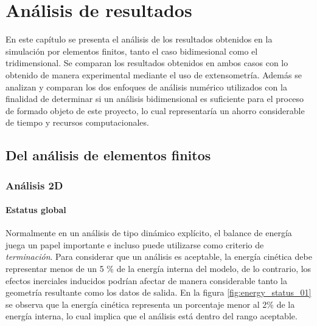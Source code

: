 \chapter{Análisis de resultados}

En este capítulo se presenta el análisis de los resultados obtenidos en la 
simulación por elementos finitos, tanto el caso bidimesional como el tridimensional. 
Se comparan los resultados obtenidos en ambos casos con lo obtenido de manera 
experimental mediante el uso de extensometría. Además se analizan y comparan  
los dos enfoques de análisis numérico utilizados con la finalidad de determinar 
si un análisis bidimensional es suficiente para el proceso de formado objeto 
de este proyecto, lo cual representaría un ahorro considerable de tiempo y recursos 
computacionales.\\

\section{Del análisis de elementos finitos}

\subsection{Análisis 2D}


\subsubsection{Estatus global}

Normalmente en un análisis de tipo dinámico explícito, el balance de energía juega 
un papel importante e incluso puede utilizarse como criterio de \textit{terminación}. 
Para considerar que un análisis es aceptable, la energía cinética debe representar 
menos de un 5 \% de la energía interna del modelo, de lo contrario, los efectos 
inerciales inducidos podrían afectar de manera considerable tanto la geometría 
resultante como los datos de salida. En la figura \ref{fig:energy_status_01} se observa 
que la energía cinética representa un porcentaje menor al 2\% de la energía interna, lo 
cual implica que el análisis está dentro del rango aceptable. \\

